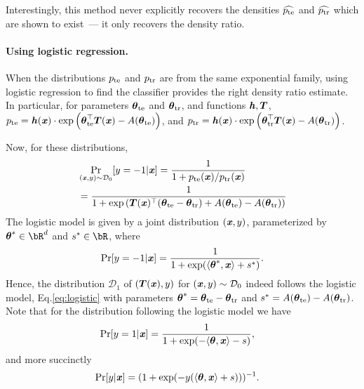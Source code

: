 Interestingly, this method never explicitly recovers the densities $\widehat{\pte}$ and $\widehat{\ptr}$ which are shown to exist~--- it only recovers the density ratio.

\paragraph{Using logistic regression.}

When the distributions $\pte$ and $\ptr$ are from the same exponential family, using logistic regression to find the classifier provides the right density ratio estimate. In particular, for parameters $\tte$ and $\ttr$, and functions $\hh,\boldsymbol{T}$, $\pte = \hh(\xx) \cdot \exp\left(\tte^{\top}\boldsymbol{T}(\xx)-A(\tte)\right)$, and $\ptr = \hh(\xx) \cdot \exp\left(\ttr^{\top}\boldsymbol{T}(\xx)-A(\ttr)\right)$.

Now, for these distributions, 
\begin{align*}
    & \Pr_{(\xx,y) \sim \mathcal{D}_0}[y=-1 | \xx]  = \frac{1}{1 + \pte(\xx)/\ptr(\xx)}\\
    & = \frac{1}{1 + \exp\left(\boldsymbol{T}(\xx)^{\top}(\tte-\ttr) + A(\tte)-A(\ttr)\right)}
\end{align*}
The logistic model is given by a joint distribution $(\xx, y)$, parameterized by $\boldsymbol{\theta}^* \in \bR^d$ and $s^* \in \bR$, where
\begin{equation}
    \Pr[y = -1 | \xx] = \frac{1}{1 + \exp(\langle \boldsymbol{\theta}^*, \xx\rangle + s^*)}.
    \label{eq:logistic}
\end{equation}
Hence, the distribution $\mathcal{D}_1$ of $(\boldsymbol{T}(\xx), y)$ for $(\xx, y) \sim \mathcal{D}_0$ indeed follows the logistic model, Eq.\eqref{eq:logistic} with parameters $\ttheta^* = \tte - \ttr$ and $s^* = A(\tte) - A(\ttr)$.
Note that for the distribution following the logistic model we have
\begin{align*}
    \Pr[y=1 | \xx] &= \frac{1}{1 + \exp(-\langle \boldsymbol{\theta}, \xx \rangle - s)},
\end{align*}
and more succinctly
\begin{align*}
    \Pr[y | \xx] & = (1 + \exp(-y(\langle \boldsymbol{\theta}, \xx \rangle +s)))^{-1}.
\end{align*}


